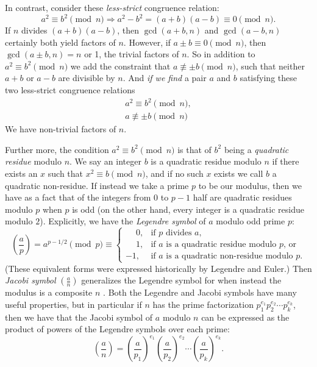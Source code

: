 \documentclass{report}
\begin{document}
In contrast, consider these \emph{less-strict} congruence relation:
\[
    a^2 \equiv b^2 \pmod n
    \Rightarrow
    a^2-b^2 = (a+b)(a-b) \equiv 0 \pmod n.
\]
If $n$ divides $(a+b)(a-b)$, then $\gcd(a+b,n)$ and $\gcd(a-b,n)$ certainly both yield factors of
$n$. However, if $a\pm b\equiv 0\pmod n$, then $\gcd(a\pm b,n)=n$ or 1, the trivial factors of $n$.
So in addition to $a^2\equiv b^2\pmod n$ we add the constraint that $a\not\equiv\pm b\pmod n$, such
that neither $a+b$ or $a-b$ are divisible by $n$. And \emph{if we find} a pair $a$ and $b$
satisfying these two less-strict congruence relations
\begin{gather}
    a^2 \equiv b^2 \pmod n, \label{eq:square-congruence1} \\
    a \not\equiv \pm b \pmod n \label{eq:square-congruence2}
\end{gather}
We have non-trivial factors of $n$.

Further more, the condition $a^2\equiv b^2\pmod n$ is that of $b^2$ being a \emph{quadratic residue}
modulo $n$. We say an integer $b$ is a quadratic residue modulo $n$ if there exists an $x$ such that
$x^2\equiv b\pmod n$, and if no such $x$ exists we call $b$ a quadratic non-residue.
If instead we take a prime $p$ to be our modulus, then we have as a fact
that of the integers from $0$ to $p-1$ half are quadratic residues modulo $p$ when $p$ is odd
(on the other hand, every integer is a quadratic residue modulo $2$).
Explicitly, we have the \emph{Legendre symbol} of $a$ modulo odd prime $p$:
\begin{equation}
    \left(\frac{a}{p}\right)
    = a^{p-1/2}\pmod p
    \equiv \begin{cases}
        \phantom{-}0, & \text{if $p$ divides $a$,} \\
        \phantom{-}1, & \text{if $a$ is a quadratic residue modulo $p$, or} \\
        -1, & \text{if $a$ is a quadratic non-residue modulo $p$.}
    \end{cases}
\end{equation}
(These equivalent forms were expressed historically by Legendre and Euler.)
Then \emph{Jacobi symbol} $\left(\frac{a}{n}\right)$ generalizes the Legendre symbol for
when instead the modulus is a composite $n$
\cite{textbook}.
Both the Legendre and Jacobi symbols have many
useful properties, but in particular if $n$ has the prime factorization
$p_1^{e_1}p_2^{e_2}\cdots p_k^{e_k}$, then we have that the Jacobi symbol of $a$ modulo $n$
can be expressed as the product of powers of the Legendre symbols over each prime:
\begin{equation}
    \left(\frac{a}{n}\right) =
    {\left(\frac{a}{p_1}\right)}^{e_1}
    {\left(\frac{a}{p_2}\right)}^{e_2}
    \cdots
    {\left(\frac{a}{p_k}\right)}^{e_k}.
\end{equation}
\end{document}
